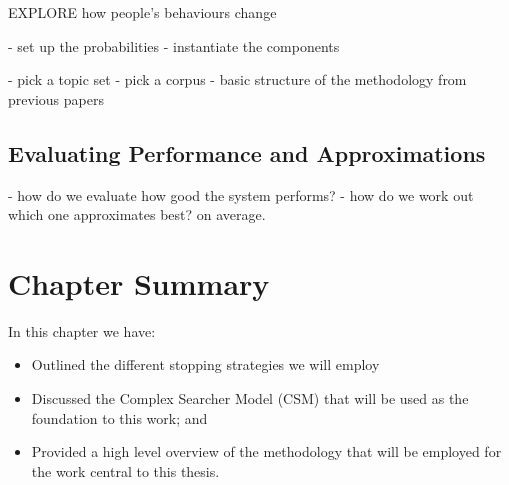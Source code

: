 EXPLORE how people's behaviours change

- set up the probabilities
- instantiate the components

- pick a topic set
- pick a corpus
- basic structure of the methodology from previous papers

\subsection{Evaluating Performance and Approximations}
- how do we evaluate how good the system performs?
- how do we work out which one approximates best? on average.



\section{Chapter Summary}
In this chapter we have:

\begin{itemize}
    
    \item{Outlined the different stopping strategies we will employ}
    \item{Discussed the Complex Searcher Model (CSM) that will be used as the foundation to this work; and}
    \item{Provided a high level overview of the methodology that will be employed for the work central to this thesis.}
    
\end{itemize}